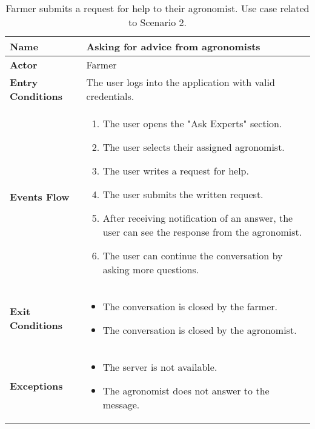 \begin{table}[hbt!]
\centering
\small
\caption{\label{tab:farmerSeekAdvice}Farmer submits a request for help to their agronomist. Use case related to Scenario 2.}
\renewcommand{\arraystretch}{1.25}

\begin{tabular}{|l|>{\raggedright\arraybackslash}m{12cm}|}

    \hline
    \textbf{Name} & Asking for advice from agronomists\\
    \hline
   	\textbf{Actor} & Farmer\\
    \hline
    \textbf{Entry Conditions} & The user logs into the application with valid credentials.\\
    \hline
    
    \textbf{Events Flow} & 
    		\begin{enumerate}
    			\item The user opens the "Ask Experts" section.
    			\item The user selects their assigned agronomist.
    			\item The user writes a request for help.
    			\item The user submits the written request.
    			\item After receiving notification of an answer, the user can see the response from the agronomist.
    			\item The user can continue the conversation by asking more questions.
    		\end{enumerate}
    	\\
    \hline
    \textbf{Exit Conditions} & \begin{itemize}
    	\item The conversation is closed by the farmer.
    	\item The conversation is closed by the agronomist.
    	\end{itemize}
    	\\
    \hline
    \textbf{Exceptions} & 
    		\begin{itemize}
    		    	\item The server is not available.
    			\item The agronomist does not answer to the message.
    		\end{itemize}
    \\
    \hline
\end{tabular}
\end{table}